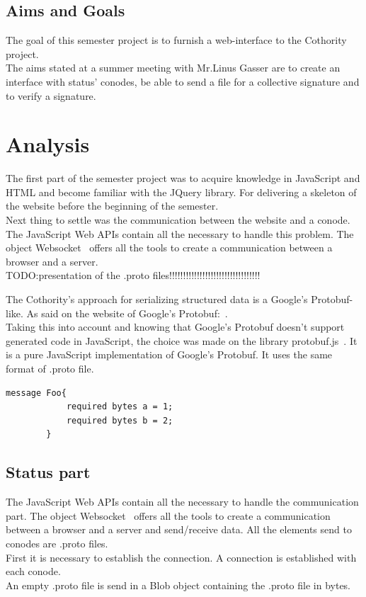 \documentclass[11pt, a4paper, twoside, openright]{book} %
\begin{document}
\section{Aims and Goals}
The goal of this semester project is to furnish a web-interface to the Cothority
project.\\
The aims stated at a summer meeting with Mr.Linus Gasser are to create an
interface with status' conodes, be able to send a file for a collective signature
and to verify a signature.\\


\chapter{Analysis}
The first part of the semester project was to acquire knowledge in JavaScript and
HTML and become familiar with the JQuery library. For delivering a skeleton of
the website before the beginning of the semester.\\
Next thing to settle was the communication between the website and a conode.
The JavaScript Web APIs contain all the necessary to handle this problem.
The object Websocket~\cite{websocketPage} offers all the tools to create a
communication between a browser and a server.\\

TODO:presentation of the .proto files!!!!!!!!!!!!!!!!!!!!!!!!!!!!!!!!!


The Cothority's approach for serializing structured data is a Google's Protobuf-like.
As said on the website of Google's Protobuf:~\cite{protobufDefi}.\\
Taking this into account and knowing that Google's Protobuf doesn't support generated
code in JavaScript, the choice was made on the library protobuf.js~\cite{protobufjs}.
It is a pure JavaScript implementation of Google's Protobuf. It uses the same format
of .proto file.

\begin{lstlisting}[caption={example of .proto file}, captionpos=b]
 message Foo{
            required bytes a = 1;
            required bytes b = 2;
        }
\end{lstlisting}

\section{Status part}
The JavaScript Web APIs contain all the necessary to handle the communication
part. The object Websocket~\cite{websocketPage} offers all the tools to create a
communication between a browser and a server and send/receive data. All the elements send to conodes are .proto files.\\
First it is necessary to establish the connection. A connection is established
with each conode.\\
An empty .proto file is send in a Blob object containing the .proto file in bytes.\\
\end{document}
